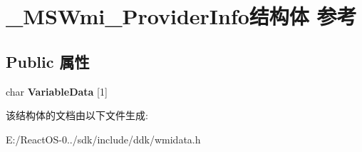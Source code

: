 \hypertarget{struct___m_s_wmi___provider_info}{}\section{\+\_\+\+M\+S\+Wmi\+\_\+\+Provider\+Info结构体 参考}
\label{struct___m_s_wmi___provider_info}
\subsection*{Public 属性}
\begin{DoxyCompactItemize}
\item 
\mbox{\label{struct___m_s_wmi___provider_info_a4ff33d4abd9160d350f5432ca7990a50}} 
char {\bfseries Variable\+Data} \mbox{[}1\mbox{]}
\end{DoxyCompactItemize}


该结构体的文档由以下文件生成\+:\begin{DoxyCompactItemize}
\item 
E\+:/\+React\+O\+S-\/0../sdk/include/ddk/wmidata.\+h\end{DoxyCompactItemize}
